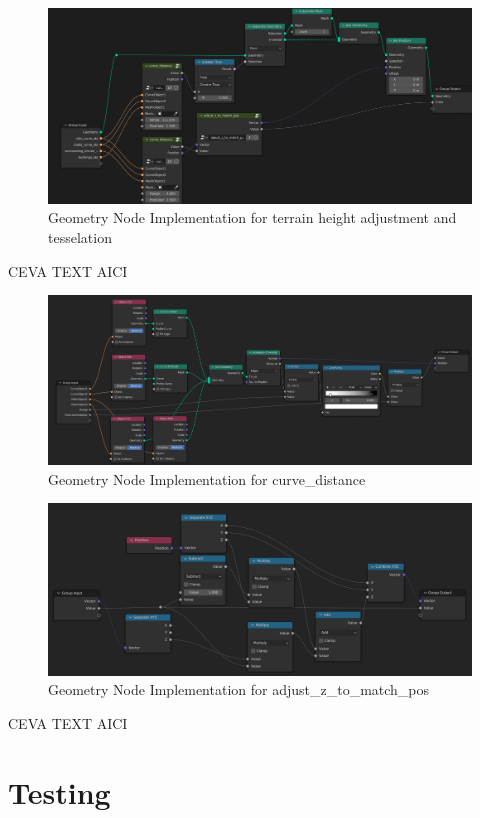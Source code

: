 \begin{figure}[H]
    \centering
    \includegraphics[width=14.5cm]{src/img/pic/pic-2 screenshot of blender adjust terrain geometry node.png}
    \caption{Geometry Node Implementation for terrain height adjustment and tesselation}
    \label{fig:design-render-interactive}
\end{figure}


CEVA TEXT AICI


\begin{figure}[H]
    \centering
    \includegraphics[width=14.5cm]{src/img/pic/pic-3 blender geometry screenshot curve_distance.png}
    \caption{Geometry Node Implementation for curve_distance}
    \label{fig:design-render-interactive}
\end{figure}
\begin{figure}[H]
    \centering
    \includegraphics[width=14.5cm]{src/img/pic/pic-4 blender geometry node screenshot adjust_z_to_match_pos.png}
    \caption{Geometry Node Implementation for adjust_z_to_match_pos}
    \label{fig:design-render-interactive}
\end{figure}


CEVA TEXT AICI

\section{Testing}
\label{sec:testing}
